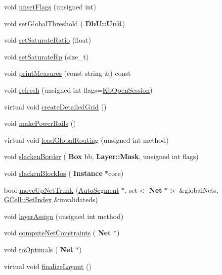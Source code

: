 \begin{DoxyCompactItemize}
\item 
void \hyperlink{classKatabatic_1_1KatabaticEngine_a1a6fac115cb81db48e3ac9ffa0721bb5}{unset\+Flags} (unsigned int)
\item 
void \hyperlink{classKatabatic_1_1KatabaticEngine_a1bd1e0104b73d4c558b0e121002796a6}{set\+Global\+Threshold} (\textbf{ Db\+U\+::\+Unit})
\item 
void \hyperlink{classKatabatic_1_1KatabaticEngine_ac2b780e06975ce8a0d6ca96f20cb971f}{set\+Saturate\+Ratio} (float)
\item 
void \hyperlink{classKatabatic_1_1KatabaticEngine_ade227e828b8c8fbfce478e353ca3ca59}{set\+Saturate\+Rp} (size\+\_\+t)
\item 
void \hyperlink{classKatabatic_1_1KatabaticEngine_a2ea4b4fc379fb85a13890db451cbf93a}{print\+Measures} (const string \&) const
\item 
void \hyperlink{classKatabatic_1_1KatabaticEngine_a1e9bb62be35c6a415a1950c72c1964ef}{refresh} (unsigned int flags=\hyperlink{namespaceKatabatic_a2af2ad6b6441614038caf59d04b3b217af314588109fcc5f5ee1c42e5fd4d0ed5}{Kb\+Open\+Session})
\item 
virtual void \hyperlink{classKatabatic_1_1KatabaticEngine_a1b7d8ed09a198f7afd6e3ac911f6eb37}{create\+Detailed\+Grid} ()
\item 
void \hyperlink{classKatabatic_1_1KatabaticEngine_aaba3b9450c85634131146fb507089f2d}{make\+Power\+Rails} ()
\item 
virtual void \hyperlink{classKatabatic_1_1KatabaticEngine_a583925cfe4bbadcc1c24fe619debce09}{load\+Global\+Routing} (unsigned int method)
\item 
void \hyperlink{classKatabatic_1_1KatabaticEngine_a145b36b18fc9149980c5d6bd4bd10e0d}{slacken\+Border} (\textbf{ Box} bb, \textbf{ Layer\+::\+Mask}, unsigned int flags)
\item 
void \hyperlink{classKatabatic_1_1KatabaticEngine_ac40754d4a9bd0cf327b5fa088e993897}{slacken\+Block\+Ios} (\textbf{ Instance} $\ast$core)
\item 
bool \hyperlink{classKatabatic_1_1KatabaticEngine_ac934a049003c9d5d2380f44ff393e458}{move\+Up\+Net\+Trunk} (\hyperlink{classKatabatic_1_1AutoSegment}{Auto\+Segment} $\ast$, set$<$ \textbf{ Net} $\ast$$>$ \&global\+Nets, \hyperlink{classKatabatic_1_1GCell_aacb1c215b203bfba5729f135b3221d40}{G\+Cell\+::\+Set\+Index} \&invalidateds)
\item 
void \hyperlink{classKatabatic_1_1KatabaticEngine_a77833ce938a430785ba869eedbc2300c}{layer\+Assign} (unsigned int method)
\item 
void \hyperlink{classKatabatic_1_1KatabaticEngine_a6957a5830a4d6f1b2daf83a7d98df601}{compute\+Net\+Constraints} (\textbf{ Net} $\ast$)
\item 
void \hyperlink{classKatabatic_1_1KatabaticEngine_ad6b9f7d94ee4a88f12c485e48d1e644a}{to\+Optimals} (\textbf{ Net} $\ast$)
\item 
virtual void \hyperlink{classKatabatic_1_1KatabaticEngine_a468eddb683c04cfeea1c5124a39e1f86}{finalize\+Layout} ()
\end{DoxyCompactItemize}
